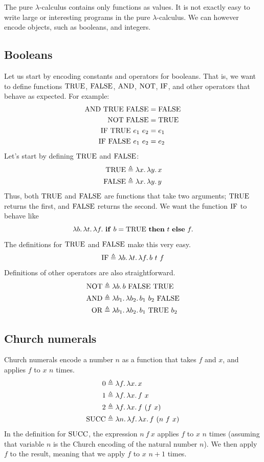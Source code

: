 The pure $\lambda$-calculus contains only functions as values. It is not exactly easy to write
large or interesting programs in the pure $\lambda$-calculus. We can however encode objects, such
as booleans, and integers.

\subsection{Booleans}

Let us start by encoding constants and operators for booleans. That is, we want to define functions
$\mathrm{TRUE}$, $\mathrm{FALSE}$, $\mathrm{AND}$, $\mathrm{NOT}$, $\mathrm{IF}$, and other operators that behave as expected. For example:
\begin{align*}
  \mathrm{AND}\ \mathrm{TRUE}\ \mathrm{FALSE}&=\mathrm{FALSE}\\
  \mathrm{NOT}\ \mathrm{FALSE}&=\mathrm{TRUE}\\
  \mathrm{IF}\ \mathrm{TRUE}\ e_1\ e_2&=e_1\\
  \mathrm{IF}\ \mathrm{FALSE}\ e_1\ e_2&=e_2
\end{align*}
Let's start by defining $\mathrm{TRUE}$ and $\mathrm{FALSE}$:
\begin{align*}
  \mathrm{TRUE}&\triangleq\lambda x.\,\lambda y.\,x\\
  \mathrm{FALSE}&\triangleq\lambda x.\,\lambda y.\,y
\end{align*}
Thus, both $\mathrm{TRUE}$ and $\mathrm{FALSE}$ are functions that take two arguments; $\mathrm{TRUE}$ returns the first, and
$\mathrm{FALSE}$ returns the second. We want the function $\mathrm{IF}$ to behave like
\[
  \lambda b.\,\lambda t.\,\lambda f.\ \mathbf{if}\ b=\tr\ \mathbf{then}\ t\ \mathbf{else}\ f.
\]
The definitions for $\mathrm{TRUE}$ and $\mathrm{FALSE}$ make this very easy.
\[
  \mathrm{IF}\triangleq\lambda b.\,\lambda t.\,\lambda f.\,b\ t\ f
\]
Definitions of other operators are also straightforward.
\begin{align*}
  \mathrm{NOT}&\triangleq\lambda b.\,b\ \mathrm{FALSE}\ \mathrm{TRUE}\\
  \mathrm{AND}&\triangleq\lambda b_1.\,\lambda b_2.\,b_1\ b_2\ \mathrm{FALSE}\\
  \mathrm{OR}&\triangleq\lambda b_1.\,\lambda b_2.\,b_1\ \mathrm{TRUE}\ b_2
\end{align*}

\subsection{Church numerals}

Church numerals encode a number $n$ as a function that takes $f$ and $x$, and applies $f$ to $x$
$n$ times.
\begin{align*}
  0&\triangleq\lambda f.\,\lambda x.\,x\\
  1&\triangleq\lambda f.\,\lambda x.\,f\ x\\
  2&\triangleq\lambda f.\,\lambda x.\,f\ (f\ x)\\
  \mathrm{SUCC}&\triangleq\lambda n.\,\lambda f.\,\lambda x.\,f\ (n\ f\ x)
\end{align*}
In the definition for $\mathrm{SUCC}$, the expression $n\ f\ x$ applies $f$ to $x$ $n$ times (assuming that
variable $n$ is the Church encoding of the natural number $n$). We then apply $f$ to the result,
meaning that we apply $f$ to $x$ $n+1$ times.

